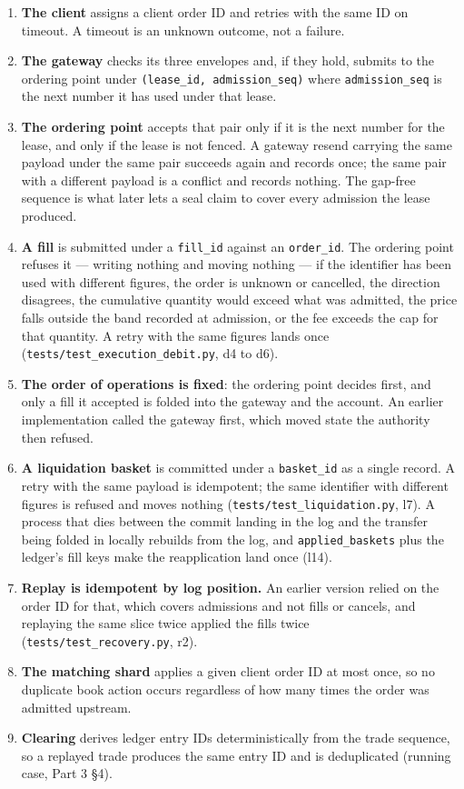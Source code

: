 \documentclass[10pt,a4paper]{article}
\providecommand{\tightlist}{\setlength{\itemsep}{0pt}\setlength{\parskip}{0pt}}
\begin{document}
\begin{enumerate}
\def\labelenumi{\arabic{enumi}.}
\tightlist
\item
  \textbf{The client} assigns a client order ID and retries with the same ID on
  timeout. A timeout is an unknown outcome, not a failure.
\item
  \textbf{The gateway} checks its three envelopes and, if they hold, submits to the
  ordering point under \texttt{(lease\_id,\ admission\_seq)} where \texttt{admission\_seq} is the
  next number it has used under that lease.
\item
  \textbf{The ordering point} accepts that pair only if it is the next number for
  the lease, and only if the lease is not fenced. A gateway resend carrying the same
  payload under the same pair succeeds again and records once; the same pair
  with a different payload is a conflict and records nothing. The gap-free
  sequence is what later lets a seal claim to cover every admission the lease
  produced.
\item
  \textbf{A fill} is submitted under a \texttt{fill\_id} against an \texttt{order\_id}. The ordering
  point refuses it --- writing nothing and moving nothing --- if the identifier has
  been used with different figures, the order is unknown or cancelled, the
  direction disagrees, the cumulative quantity would exceed what was admitted,
  the price falls outside the band recorded at admission, or the fee exceeds the
  cap for that quantity. A retry with the same figures lands once
  (\texttt{tests/test\_execution\_debit.py}, d4 to d6).
\item
  \textbf{The order of operations is fixed}: the ordering point decides first, and
  only a fill it accepted is folded into the gateway and the account. An earlier
  implementation called the gateway first, which moved state the authority then
  refused.
\item
  \textbf{A liquidation basket} is committed under a \texttt{basket\_id} as a single record.
  A retry with the same payload is idempotent; the same identifier with
  different figures is refused and moves nothing (\texttt{tests/test\_liquidation.py},
  l7). A process that dies between the commit landing in the log and the
  transfer being folded in locally rebuilds from the log, and \texttt{applied\_baskets}
  plus the ledger's fill keys make the reapplication land once (l14).
\item
  \textbf{Replay is idempotent by log position.} An earlier version relied on the
  order ID for that, which covers admissions and not fills or cancels, and
  replaying the same slice twice applied the fills twice
  (\texttt{tests/test\_recovery.py}, r2).
\item
  \textbf{The matching shard} applies a given client order ID at most once, so no
  duplicate book action occurs regardless of how many times the order was
  admitted upstream.
\item
  \textbf{Clearing} derives ledger entry IDs deterministically from the trade
  sequence, so a replayed trade produces the same entry ID and is deduplicated
  (running case, Part 3 §4).
\end{enumerate}
\end{document}
